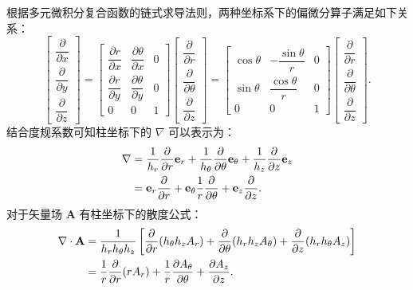 \documentclass[12pt,a4paper,fontset=none]{ctexart}
\begin{document}
根据多元微积分复合函数的链式求导法则，两种坐标系下的偏微分算子满足如下关系：
\begin{equation}
\begin{bmatrix}
\dfrac{\partial}{\partial x} \\[10pt]
\dfrac{\partial}{\partial y} \\[10pt]
\dfrac{\partial}{\partial z}
\end{bmatrix}
=
\begin{bmatrix}
\dfrac{\partial r}{\partial x} & \dfrac{\partial\theta}{\partial x} & 0 \\[10pt]
\dfrac{\partial r}{\partial y} & \dfrac{\partial\theta}{\partial y} & 0 \\[10pt]
0 & 0 & 1
\end{bmatrix}
\begin{bmatrix}
\dfrac{\partial}{\partial r} \\[10pt]
\dfrac{\partial}{\partial\theta} \\[10pt]
\dfrac{\partial}{\partial z}
\end{bmatrix}
=
\begin{bmatrix}
\cos\theta & -\dfrac{\sin\theta}{r} & 0 \\[10pt]
\sin\theta & \dfrac{\cos\theta}{r} & 0 \\[10pt]
0 & 0 & 1
\end{bmatrix}
\begin{bmatrix}
\dfrac{\partial}{\partial r} \\[10pt]
\dfrac{\partial}{\partial\theta} \\[10pt]
\dfrac{\partial}{\partial z}
\end{bmatrix}.\label{eq:jacobi_transform}
\end{equation}
结合度规系数可知柱坐标下的 $\nabla$ 可以表示为：
\begin{align}
\nabla &= \frac{1}{h_r}\frac{\partial}{\partial r}\mathbf{e}_r + \frac{1}{h_\theta}\frac{\partial}{\partial\theta}\mathbf{e}_\theta + \frac{1}{h_z}\frac{\partial}{\partial z}\mathbf{e}_z \notag\\
&= \mathbf{e}_r\frac{\partial}{\partial r} + \mathbf{e}_\theta\frac1r\frac{\partial}{\partial\theta} + \mathbf{e}_z\frac{\partial}{\partial z}.\label{eq:grad_cyl}
\end{align}
对于矢量场 $\mathbf{A}$ 有柱坐标下的散度公式：
\begin{align}
\nabla\cdot\mathbf{A} &= \frac{1}{h_rh_\theta h_z}\left[\frac{\partial}{\partial r}(h_\theta h_zA_r) + \frac{\partial}{\partial\theta}(h_rh_zA_\theta) + \frac{\partial}{\partial z}(h_rh_\theta A_z)\right] \notag\\
&= \frac1r\frac{\partial}{\partial r}(rA_r) + \frac1r\frac{\partial A_\theta}{\partial\theta} + \frac{\partial A_z}{\partial z}.\label{eq:div_cyl}
\end{align}
\end{document}
